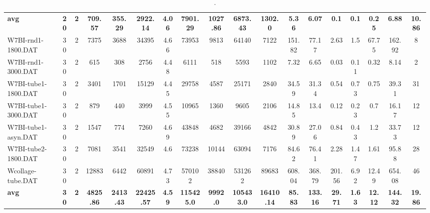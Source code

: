 \begin{sidewaystable}[h]
{\begin{tabular}{lccccccccccccccccc}
\cline{1-18} \textbf{avg} & \textbf{20} & \textbf{2} & \textbf{709.57} & \textbf{355.29} & \textbf{2922.14} & \textbf{4.06} & \textbf{7901.29} & \textbf{1027.86} & \textbf{6873.43} & \textbf{1302.0} & \textbf{5.36} & \textbf{6.07} & \textbf{0.1} & \textbf{0.1} & \textbf{0.25} & \textbf{6.88} & \textbf{10.86} \\ \cline{1-18}
W7BI-rnd1-1800.DAT & 30 & 2 & 7375 & 3688 & 34395 & 4.66 & 73953 & 9813 & 64140 & 7122 & 151.82 & 77.17 & 2.63 & 1.5 & 67.75 & 162.92 & 8\\
W7BI-rnd1-3000.DAT & 30 & 2 & 615 & 308 & 2756 & 4.48 & 6111 & 518 & 5593 & 1102 & 7.32 & 6.65 & 0.03 & 0.11 & 0.32 & 8.14 & 2\\
W7BI-tube1-1800.DAT & 30 & 2 & 3401 & 1701 & 15129 & 4.45 & 29758 & 4587 & 25171 & 2840 & 34.59 & 31.34 & 0.54 & 0.73 & 0.75 & 39.31 & 31\\
W7BI-tube1-3000.DAT & 30 & 2 & 879 & 440 & 3999 & 4.55 & 10965 & 1360 & 9605 & 2106 & 14.85 & 13.4 & 0.12 & 0.23 & 0.7 & 16.17 & 12\\
W7BI-tube1-asyn.DAT & 30 & 2 & 1547 & 774 & 7260 & 4.69 & 43848 & 4682 & 39166 & 4842 & 30.89 & 27.06 & 0.84 & 0.43 & 1.2 & 33.73 & 12\\
W7BI-tube2-1800.DAT & 30 & 2 & 7081 & 3541 & 32549 & 4.6 & 73238 & 10144 & 63094 & 7176 & 84.62 & 76.41 & 2.28 & 1.47 & 1.61 & 95.88 & 28\\
Wcollage-tube.DAT & 30 & 2 & 12883 & 6442 & 60891 & 4.73 & 570102 & 38840 & 531262 & 89683 & 608.04 & 368.79 & 201.56 & 6.92 & 12.49 & 654.08 & 46\\
\cline{1-18} \textbf{avg} & \textbf{30} & \textbf{2} & \textbf{4825.86} & \textbf{2413.43} & \textbf{22425.57} & \textbf{4.59} & \textbf{115425.0} & \textbf{9992.0} & \textbf{105433.0} & \textbf{16410.14} & \textbf{85.83} & \textbf{133.16} & \textbf{29.71} & \textbf{1.63} & \textbf{12.12} & \textbf{144.32} & \textbf{19.86} \\ \cline{1-18}
\bottomrule
\end{tabular}%
}%
\caption{.}
\label{tab:table_bc_heur_tri}
\end{sidewaystable}

